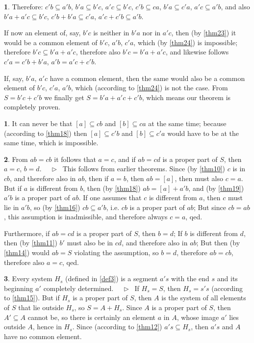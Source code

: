 \documentclass[leqno,hidelinks]{article}
\theoremstyle{definition}
\newtheorem{satz}{\protect\satzname}
\newtheorem*{zusatz}{\protect\zusatzname}
\newcommand{\satzname}{}
\newcommand{\zusatzname}{}
\renewcommand{\satzname}{\hspace{-4pt}.\ Satz}%
\renewcommand{\zusatzname}{Zusatz}%
\renewcommand{\satzname}{\hspace{-4pt}.\ Theorem}%
\renewcommand{\zusatzname}{Corollary}%
\newcommand\Beweis{\medskip \newline $ \phantom{'.'} \rhd \ $}%
\newcommand{\partof}{\subseteq}
\newcommand{\sref}[1]{\underline{\ref{#1}}}%
\begin{document}
\begin{paracol}{2}
\begin{satz}
Therefore: $c'b \partof a'b$, $b'a \partof b'c$, $a'c \partof b'c$,
$c'b \partof ca$, $b'a \partof c'a$, $a'c \partof a'b$, and also
$b'a + a'c \partof b'c$, $c'b + b'a \partof c'a$, $a'c + c'b \partof a'b$.

\newpage

If now an element of, say, $b'c$ is neither in $b'a$ nor in $a'c$, then
(by \sref{thm23}) it would be a common element of $b'c$, $a'b$, $c'a$,
which (by \sref{thm24}) is impossible; therefore $b'c \partof b'a + a'c$,
therefore also $b'c=b'a + a'c$, and likewise follows $c'a=c'b+b'a$, $a'b=a'c+c'b$.

If, say, $b'a$, $a'c$ have a common element, then the same would also be a common
element of $b'c$, $c'a$, $a'b$, which (according to \sref{thm24}) is not the case.
From $S=b'c+c'b$ we finally get $S=b'a+a'c+c'b$, which means our theorem is
completely proven.
\end{satz}

\begin{zusatz}
It can never be that $[a] \partof cb$ and $[b] \partof ca$ at the same time;
because (according to \sref{thm18}) then $[a] \partof c'b$ and $[b] \partof c'a$
would have to be at the same time, which is impossible.
\end{zusatz}

\begin{satz}\label{thm26}
From $ab=cb$ it follows that $a=c$, and if $ab=cd$ is a proper part of $S$,
then $a=c$, $b = d$.
\Beweis
This follows from earlier theorems.
Since (by \sref{thm10}) $c$ is in $cb$, and therefore also in $ab$, then if
$a=b$, then $ab = [a]$, then must also $c=a$. But if $a$ is different from $b$,
then (by \sref{thm18}) $ab = [a]+a'b$, and (by \sref{thm19}) $a'b$ is a proper
part of $ab$. If one assumes that $c$ is different from $a$, then $c$ must lie
in $a'b$, so (by \sref{thm16}) $cb \partof a'b$, i.e. $cb$ is a proper part of $ab$;
But since $cb=ab$, this assumption is inadmissible, and therefore always $c=a$, qed.

Furthermore, if $ab=cd$ is a proper part of $S$, then $b=d$; If $b$ is different
from $d$, then (by \sref{thm11}) $b'$ must also be in $cd$, and therefore also in
$ab$; But then (by \sref{thm14}) would $ab = S$ violating the assumption, so $b=d$,
therefore $ab=cb$, therefore also $a=c$, qed.
\end{satz}

\begin{satz}\label{thm27}
Every system $H_s$ (defined in \sref{def3}) is a segment $a's$ with the end $s$
and its beginning $a'$ completely determined.
\Beweis
If $H_s= S$, then $H_s= s's$ (according to \sref{thm15}).
But if $H_s$ is a proper part of $S$, then $A$ is the system of all elements
of $S$ that lie outside $H_s$, so $S=A+H_s$. Since $A$ is a proper part of $S$,
then $A' \partof A$ cannot be, so there is certainly an element $a$ in $A$, whose
image $a'$ lies outside $A$, hence in $H_s$. Since (according to \sref{thm12})
$a's \partof H_s$, then $a's$ and $A$ have no common element.


\end{satz}
\end{paracol}
\end{document}
